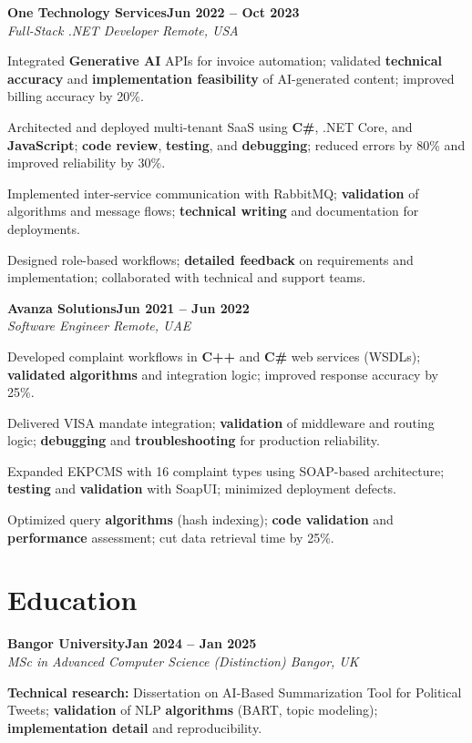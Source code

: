 \documentclass[letterpaper,10pt]{article}
\newcommand{\headingBf}[2]{
  \hspace{10pt}\textbf{#1}\hfill\textbf{#2}\\
}
\newcommand{\headingIt}[2]{
  \hspace{10pt}\textit{#1}\hfill\textit{#2}\\
}
\newenvironment{resume_list}{
  \vspace{-7pt}
  \begin{itemize}[itemsep=-2px, parsep=1pt, leftmargin=30pt]
}{
  \end{itemize}
}
\begin{document}
\headingBf{One Technology Services}{Jun 2022 -- Oct 2023}
\headingIt{Full-Stack .NET Developer \hfill Remote, USA}{}
\begin{resume_list}
    \item Integrated \textbf{Generative AI} APIs for invoice automation; validated \textbf{technical accuracy} and \textbf{implementation feasibility} of AI-generated content; improved billing accuracy by 20\%.
    \item Architected and deployed multi-tenant SaaS using \textbf{C\#}, .NET Core, and \textbf{JavaScript}; \textbf{code review}, \textbf{testing}, and \textbf{debugging}; reduced errors by 80\% and improved reliability by 30\%.
    \item Implemented inter-service communication with RabbitMQ; \textbf{validation} of algorithms and message flows; \textbf{technical writing} and documentation for deployments.
    \item Designed role-based workflows; \textbf{detailed feedback} on requirements and implementation; collaborated with technical and support teams.
\end{resume_list}

\headingBf{Avanza Solutions}{Jun 2021 -- Jun 2022}
\headingIt{Software Engineer \hfill Remote, UAE}{}
\begin{resume_list}
    \item Developed complaint workflows in \textbf{C++} and \textbf{C\#} web services (WSDLs); \textbf{validated} \textbf{algorithms} and integration logic; improved response accuracy by 25\%.
    \item Delivered VISA mandate integration; \textbf{validation} of middleware and routing logic; \textbf{debugging} and \textbf{troubleshooting} for production reliability.
    \item Expanded EKPCMS with 16 complaint types using SOAP-based architecture; \textbf{testing} and \textbf{validation} with SoapUI; minimized deployment defects.
    \item Optimized query \textbf{algorithms} (hash indexing); \textbf{code validation} and \textbf{performance} assessment; cut data retrieval time by 25\%.
\end{resume_list}

\section{Education}

\headingBf{Bangor University}{Jan 2024 -- Jan 2025}
\headingIt{MSc in Advanced Computer Science (Distinction) \hfill Bangor, UK}{}
\begin{resume_list}
    \item \textbf{Technical research:} Dissertation on AI-Based Summarization Tool for Political Tweets; \textbf{validation} of NLP \textbf{algorithms} (BART, topic modeling); \textbf{implementation detail} and reproducibility.
\end{resume_list}
\end{document}
